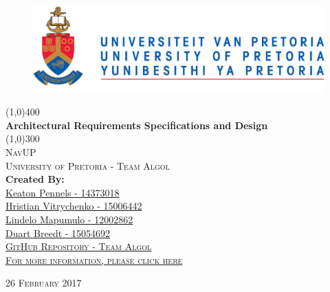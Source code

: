\documentclass{article}
\begin{document}
	\begin{titlepage}
		\begin{center}

			\begin{figure}
				\includegraphics[width=\linewidth]{logo.jpg}	
			\end{figure}

			\line(1,0){400}\\
			[6mm]
			\huge{
				\bfseries Architectural Requirements Specifications and Design
			}\\
			[2mm]
			\line(1,0){300}\\
			[10mm]
			\textsc{\large NavUP}\\
			[7.5mm]
			\textsc{\large University of Pretoria - Team Algol}\\
			[10mm]
			\large{\textbf{Created By:}}\\
			[2mm]
			\href{https://github.com/KeatonPennels}{Keaton Pennels - 14373018}\\
			\href{https://github.com/Chris19951225}{Hristian Vitrychenko - 15006442}\\
      \href{https://github.com/lindelo}{Lindelo Mapumulo - 12002862}\\
			\href{https://github.com/DuartBreedt}{Duart Breedt - 15054692}\\[5mm]


		\href{https://github.com/Chris19951225/COS-301-Team-Algol}{\textsc{\Large GitHub Repository - Team Algol}}
		\\
		\href{https://github.com/Chris19951225/COS-301-Team-Algol}{\textsc {For more information, please click here}}
		  
		\end{center}
		\begin{flushright}
			\textsc{\large 26 February 2017}
		\end{flushright}
	\end{titlepage}

	\cleardoublepage
	\thispagestyle{empty}
	\tableofcontents
	\cleardoublepage

	\thispagestyle{empty}
	\listoffigures
	\cleardoublepage
	\setcounter{page}{1}
	
\end{document}
